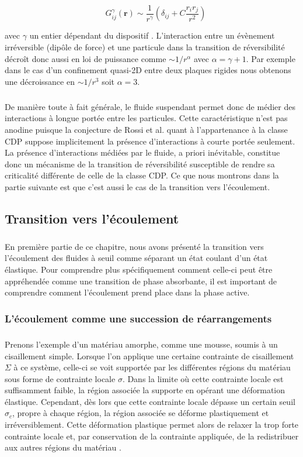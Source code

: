 \begin{equation}
\quad G^\gamma_{ij}(\mathbf{r}) \sim \frac{1}{r^\gamma}\left( \delta_{ij}+ C\frac{r_ir_j}{r^2} \right)
\end{equation}

\noindent avec $\gamma$ un entier dépendant du dispositif \cite{diamant_hydrodynamic_2009}. L'interaction entre un évènement irréversible (dipôle de force) et une particule dans la transition de réversibilité décroît donc aussi en loi de puissance comme $\sim 1/r^\alpha$ avec $\alpha = \gamma+1$. Par exemple dans le cas d'un confinement quasi-2D entre deux plaques rigides nous obtenons une décroissance en $\sim 1/r^3$ soit $\alpha = 3$.

\subparagraph{}De manière toute à fait générale, le fluide suspendant permet donc de médier des interactions à longue portée entre les particules. Cette caractéristique n'est pas anodine puisque la conjecture de Rossi et al. \cite{rossi_universality_2000} quant à l'appartenance à la classe CDP suppose implicitement la présence d'interactions à courte portée seulement. La présence d'interactions médiées par le fluide, a priori inévitable, constitue donc un mécanisme de la transition de réversibilité susceptible de rendre sa criticalité différente de celle de la classe CDP. Ce que nous montrons dans la partie suivante est que c'est aussi le cas de la transition vers l'écoulement.

\subsection{Transition vers l'écoulement}

\label{sec:yieldingCDP}

\subparagraph{}En première partie de ce chapitre, nous avons présenté la transition vers l'écoulement des fluides à seuil comme séparant un état coulant d'un état élastique. Pour comprendre plus spécifiquement comment celle-ci peut être appréhendée comme une transition de phase absorbante, il est important de comprendre comment l'écoulement prend place dans la phase active.

\subsubsection{L'écoulement comme une succession de réarrangements}

\subparagraph{}Prenons l'exemple d'un matériau amorphe, comme une mousse, soumis à un cisaillement simple. Lorsque l'on applique une certaine contrainte de cisaillement $\Sigma$ à ce système, celle-ci se voit supportée par les différentes régions du matériau sous forme de contrainte locale $\sigma$. Dans la limite où cette contrainte locale est suffisamment faible, la région associée la supporte en opérant une déformation élastique. Cependant, dès lors que cette contrainte locale dépasse un certain seuil $\sigma_c$, propre à chaque région, la région associée se déforme plastiquement et irréversiblement. Cette déformation plastique permet alors de relaxer la trop forte contrainte locale et, par conservation de la contrainte appliquée, de la redistribuer aux autres régions du matériau \cite{nicolas_deformation_2018}. 

